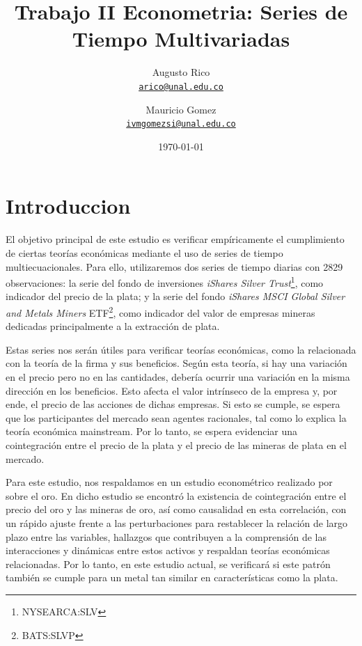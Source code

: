 \documentclass[11pt]{article}
\title{Trabajo II Econometria: Series de Tiempo Multivariadas
}
\author{Augusto Rico\\
    \href{mailto:arico@unal.edu.co}{\texttt{arico@unal.edu.co}}
\and Mauricio Gomez\\%
    \href{mailto:ivmgomezsi@unal.edu.co}{\texttt{ivmgomezsi@unal.edu.co}} %
    }
\date{\today}
\begin{document}
\maketitle



\section{Introduccion}
\begin{flushleft}
    El objetivo principal de este estudio es verificar empíricamente el cumplimiento de ciertas teorías económicas mediante el uso de series de tiempo multiecuacionales. Para ello, utilizaremos dos series de tiempo diarias con 2829 observaciones: la serie del fondo de inversiones \textit{iShares Silver Trust}\footnote{NYSEARCA:SLV}, como indicador del precio de la plata; y la serie del fondo \textit{iShares MSCI Global Silver and Metals Miners} ETF\footnote{BATS:SLVP}, como indicador del valor de empresas mineras dedicadas principalmente a la extracción de plata.

    Estas series nos serán útiles para verificar teorías económicas, como la relacionada con la teoría de la firma y sus beneficios. Según esta teoría, si hay una variación en el precio pero no en las cantidades, debería ocurrir una variación en la misma dirección en los beneficios. Esto afecta el valor intrínseco de la empresa y, por ende, el precio de las acciones de dichas empresas. Si esto se cumple, se espera que los participantes del mercado sean agentes racionales, tal como lo explica la teoría económica mainstream. Por lo tanto, se espera evidenciar una cointegración entre el precio de la plata y el precio de las mineras de plata en el mercado.
    
    Para este estudio, nos respaldamos en un estudio econométrico realizado por \citet{Gilmore_McManus_Sharma_Tezel_2009} sobre el oro. En dicho estudio se encontró la existencia de cointegración entre el precio del oro y las mineras de oro, así como causalidad en esta correlación, con un rápido ajuste frente a las perturbaciones para restablecer la relación de largo plazo entre las variables, hallazgos que contribuyen a la comprensión de las interacciones y dinámicas entre estos activos y respaldan teorías económicas relacionadas. Por lo tanto, en este estudio actual, se verificará si este patrón también se cumple para un metal tan similar en características como la plata.
\end{flushleft}
\end{document}
